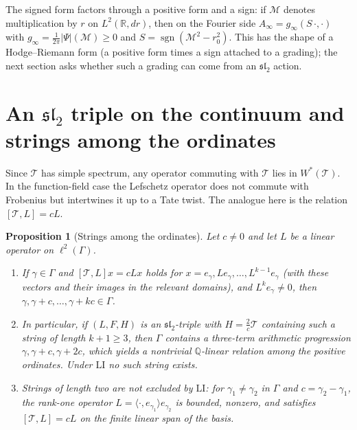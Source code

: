 \documentclass[11pt]{amsart}
\newtheorem{proposition}[theorem]{Proposition}
\theoremstyle{definition}
\theoremstyle{remark}
\newcommand{\T}{\mathcal T}
\newcommand{\M}{\mathcal M}
\newcommand{\Ainf}{A_\infty}
\newcommand{\sltwo}{\mathfrak{sl}_2}
\DeclareMathOperator{\sgn}{sgn}
\begin{document}
The signed form factors through a positive form and a sign: if $\M$ denotes
multiplication by $r$ on $L^2(\mathbb R,dr)$, then on the Fourier side
$\Ainf=g_\infty(S\,\cdot,\cdot)$ with $g_\infty=\frac1{2\pi}|\Psi|(\M)\ge0$ and
$S=\sgn(\M^2-r_0^2)$. This has the shape of a Hodge--Riemann form (a positive
form times a sign attached to a grading); the next section asks whether such a
grading can come from an $\sltwo$ action.

\section{\texorpdfstring{An $\mathfrak{sl}_2$ triple on the continuum and strings among the ordinates}{An sl2 triple on the continuum and strings among the ordinates}}\label{sec:sl2}
Since $\T$ has simple spectrum, any operator commuting with $\T$ lies in
$W^*(\T)$. In the function-field case the Lefschetz operator does not commute
with Frobenius but intertwines it up to a Tate twist. The analogue here is the
relation $[\T,L]=cL$.

\begin{proposition}[Strings among the ordinates]\label{prop:nogo}
Let $c\ne0$ and let $L$ be a linear operator on $\ell^2(\Gamma)$.
\begin{enumerate}
\item[\rm(i)] If $\gamma\in\Gamma$ and $[\T,L]x=cLx$ holds for
$x=e_\gamma,Le_\gamma,\dots,L^{k-1}e_\gamma$ (with these vectors and their images
in the relevant domains), and $L^ke_\gamma\neq0$, then
$\gamma,\gamma+c,\dots,\gamma+kc\in\Gamma$.
\item[\rm(ii)] In particular, if $(L,F,H)$ is an $\sltwo$-triple with
$H=\frac2c\T$ containing such a string of length $k+1\ge3$, then $\Gamma$
contains a three-term arithmetic progression $\gamma,\gamma+c,\gamma+2c$, which
yields a nontrivial $\mathbb Q$-linear relation among the positive ordinates.
Under $\mathrm{LI}$ no such string exists.
\item[\rm(iii)] Strings of length two are not excluded by $\mathrm{LI}$: for
$\gamma_1\ne\gamma_2$ in $\Gamma$ and $c=\gamma_2-\gamma_1$, the rank-one
operator $L=\langle\cdot,e_{\gamma_1}\rangle e_{\gamma_2}$ is bounded, nonzero,
and satisfies $[\T,L]=cL$ on the finite linear span of the basis.
\end{enumerate}
\end{proposition}
\end{document}
